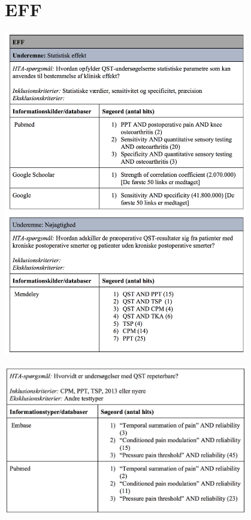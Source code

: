 \section{EFF}
\includegraphics[width=0.8\textwidth]{rapportAfsnit/qBilag/sogninger/EFF1}

\includegraphics[width=0.8\textwidth]{rapportAfsnit/qBilag/sogninger/EFF2}

